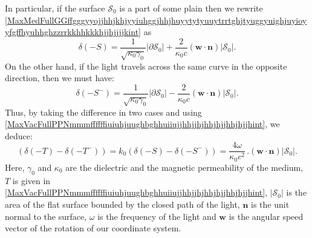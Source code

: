 \documentclass{article}
\theoremstyle{definition}
\theoremstyle{remark}
\renewcommand{\vec}[1]{\mathbf{#1}}
\newcommand{\er}{\eqref}
\newcommand{\er}{\eqref}
\begin{document}
In particular, if the surface $\mathcal{S}_0$ is a part of some
plain then we rewrite
\er{MaxMedFullGGffgggyyojjhhjkhjyyiuhggjhhjhuyytytyuuytrrtghjtyuggyuighjuyioyyfgffhyuhhghzzrrkkhhkkkhjjhjjjjkint}
as
\begin{equation}\label{MaxMedFullGGffgggyyojjhhjkhjyyiuhggjhhjhuyytytyuuytrrtghjtyuggyuighjuyioyyfgffhyuhhghzzrrkkhhkkkhjjhjjjjkjjkjljklint}
\delta(-S)=\frac{1}{\sqrt{\kappa_0\gamma_0}}\left|\partial
\mathcal{S}_0\right|+\frac{2}{\kappa_0 c} \left(\vec w\cdot\vec
n\right)\left|\mathcal{S}_0\right|.
\end{equation}
On the other hand, if the light travels across the same curve in the
opposite direction, then we must have:
\begin{equation}\label{MaxMedFullGGffgggyyojjhhjkhjyyiuhggjhhjhuyytytyuuytrrtghjtyuggyuighjuyioyyfgffhyuhhghzzrrkkhhkkkhjjhjjjjkjjkjljklpooint}
\delta(-S^-)=\frac{1}{\sqrt{\kappa_0\gamma_0}}\left|\partial
\mathcal{S}_0\right|-\frac{2}{\kappa_0 c} \left(\vec w\cdot\vec
n\right)\left|\mathcal{S}_0\right|.
\end{equation}
Thus, by taking the difference in two cases and using
\er{MaxVacFullPPNmmmffffffiuiuhjuughbghhuiiujjhhjjhjhhjhjjhhjhjjhint},
we deduce:
\begin{equation}\label{MaxMedFullGGffgggyyojjhhjkhjyyiuhggjhhjhuyytytyuuytrrtghjtyuggyuighjuyioyyfgffhyuhhghzzrrkkhhkkkhjjhjjjjkjjkjljklkkkhjhjint}
\left(\delta(-T)-\delta(-T^-)\right)=k_0\left(\delta(-S)-\delta(-S^-)\right)=\frac{4\omega}{\kappa_0
c^2}\,. \left(\vec w\cdot\vec n\right)\left|\mathcal{S}_0\right|.
\end{equation}
Here, $\gamma_0$ and $\kappa_0$ are the dielectric and the magnetic
permeability of the medium, $T$ is given in
\er{MaxVacFullPPNmmmffffffiuiuhjuughbghhuiiujjhhjjhjhhjhjjhhjhjjhint},
$\left|\mathcal{S}_0\right|$ is the area of the flat surface bounded
by the closed path of the light, $\vec n$ is the unit normal to the
surface, $\omega$ is the frequency of the light and $\vec w$ is the
angular speed vector of the rotation of our coordinate system.
\end{document}
